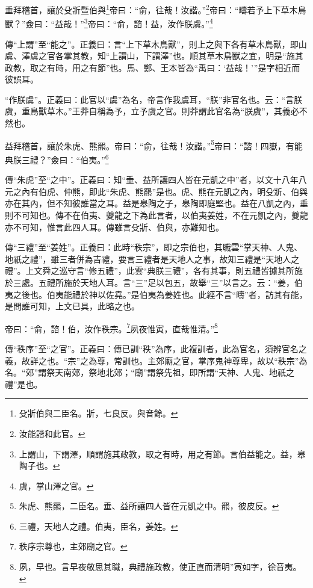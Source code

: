垂拜稽首，讓於殳斨暨伯與\footnote{殳斨伯與二臣名。斨，七良反。與音餘。}帝曰：“俞，往哉！汝諧。”\footnote{汝能諧和此官。}帝曰：“疇若予上下草木鳥獸？”僉曰：“益哉！”\footnote{上謂山，下謂澤，順謂施其政教，取之有時，用之有節。言伯益能之。益，皋陶子也。}帝曰：“俞，諮！益，汝作朕虞。”\footnote{虞，掌山澤之官。}

{\noindent\zhuan{}\fzbyks 傳“上謂”至“能之”。正義曰：言“上下草木鳥獸”，則上之與下各有草木鳥獸，即山虞、澤虞之官各掌其教，知“上謂山，下謂澤”也。順其草木鳥獸之宜，明是“施其政教，取之有時，用之有節”也。馬、鄭、王本皆為“禹曰：‘益哉！’”是字相近而彼誤耳。 \par}

{\noindent\zhuan{}\fzbyks “作朕虞”。正義曰：此官以“虞”為名，帝言作我虞耳，“朕”非官名也。云：“言朕虞，重鳥獸草木。”王莽自稱為予，立予虞之官。則莽謂此官名為“朕虞”，其義必不然也。 \par}

益拜稽首，讓於朱虎、熊羆。帝曰：“俞，往哉！汝諧。”\footnote{朱虎、熊羆，二臣名。垂、益所讓四人皆在元凱之中。羆，彼皮反。}帝曰：“諮！四嶽，有能典朕三禮？”僉曰：“伯夷。”\footnote{三禮，天地人之禮。伯夷，臣名，姜姓。}

{\noindent\zhuan{}\fzbyks 傳“朱虎”至“之中”。正義曰：知“垂、益所讓四人皆在元凱之中”者，以文十八年八元之內有伯虎、仲熊，即此“朱虎、熊羆”是也。虎、熊在元凱之內，明殳斨、伯與亦在其內，但不知彼誰當之耳。益是皋陶之子，皋陶即庭堅也。益在八凱之內，垂則不可知也。傳不在伯夷、夔龍之下為此言者，以伯夷姜姓，不在元凱之內，夔龍亦不可知，惟言此四人耳。傳雖言殳斨、伯與，亦難知也。 \par}

{\noindent\zhuan{}\fzbyks 傳“三禮”至“姜姓”。正義曰：此時“秩宗”，即之宗伯也，其職雲“掌天神、人鬼、地祇之禮”，雖三者併為吉禮，要言三禮者是天地人之事，故知三禮是“天地人之禮”。上文舜之巡守言“修五禮”，此雲“典朕三禮”，各有其事，則五禮皆據其所施於三處。五禮所施於天地人耳。言“三”足以包五，故舉“三”以言之。云：“姜，伯夷之後也。伯夷能禮於神以佐堯。”是伯夷為姜姓也。此經不言“疇”者，訪其有能，是問誰可知，上文已具，此略之也。 \par}

帝曰：“俞，諮！伯，汝作秩宗。\footnote{秩序宗尊也，主郊廟之官。}夙夜惟寅，直哉惟清。”\footnote{夙，早也。言早夜敬思其職，典禮施政教，使正直而清明”寅如字，徐音夷。}

{\noindent\zhuan{}\fzbyks 傳“秩序”至“之官”。正義曰：傳已訓“秩”為序，此複訓者，此為官名，須辨官名之義，故詳之也。“宗”之為尊，常訓也。主郊廟之官，掌序鬼神尊卑，故以“秩宗”為名。“郊”謂祭天南郊，祭地北郊；“廟”謂祭先祖，即所謂“天神、人鬼、地祇之禮”是也。 \par}

